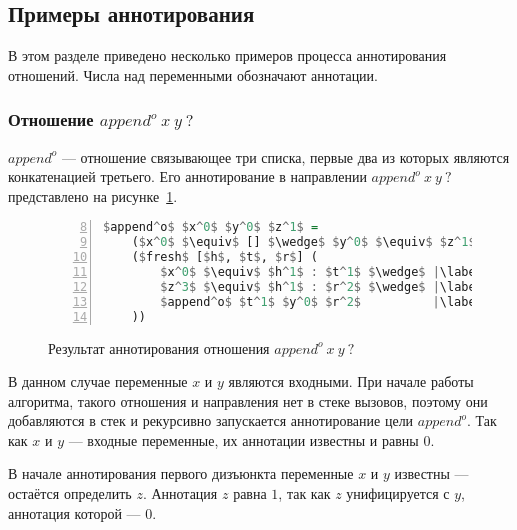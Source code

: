 \subsection{Примеры аннотирования}

В этом разделе приведено несколько примеров процесса аннотирования отношений.
Числа над переменными обозначают аннотации.


\subsubsection{Отношение $append^o \ x \ y \ ?$}

$append^o$ --- отношение связывающее три списка, первые два из которых являются конкатенацией третьего.
Его аннотирование в направлении $append^o \ x \ y \ ?$ представлено на рисунке~\ref{lst:appendoIIOANN}.

\begin{figure}[h!]
  \begin{center}
  \begin{minipage}{0.35\textwidth}
  \begin{lstlisting}[language=Haskell, frame=single, numbers=left,numberstyle=\small, firstnumber=8, escapechar=|]
  $append^o$ $x^0$ $y^0$ $z^1$ =
    ($x^0$ $\equiv$ [] $\wedge$ $y^0$ $\equiv$ $z^1$) $\vee$ |\label{line:appendoIIOANN2}|
    ($fresh$ [$h$, $t$, $r$] (
        $x^0$ $\equiv$ $h^1$ : $t^1$ $\wedge$ |\label{line:appendoIIOANN4}|
        $z^3$ $\equiv$ $h^1$ : $r^2$ $\wedge$ |\label{line:appendoIIOANN5}|
        $append^o$ $t^1$ $y^0$ $r^2$          |\label{line:appendoIIOANN6}|
    ))
    \end{lstlisting}
  \end{minipage}
  \end{center}
  \caption{Результат аннотирования отношения $append^o \ x \ y \ ?$}
  \label{lst:appendoIIOANN}
\end{figure}

В данном случае переменные $x$ и $y$ являются входными. 
При начале работы алгоритма, такого отношения и направления нет в стеке вызовов, поэтому они добавляются в стек и рекурсивно запускается аннотирование цели $append^o$.
Так как $x$ и $y$ --- входные переменные, их аннотации известны и равны $0$.

В начале аннотирования первого дизъюнкта переменные $x$ и $y$ известны --- остаётся определить $z$.
Аннотация $z$ равна $1$, так как $z$ унифицируется с $y$, аннотация которой --- $0$.

